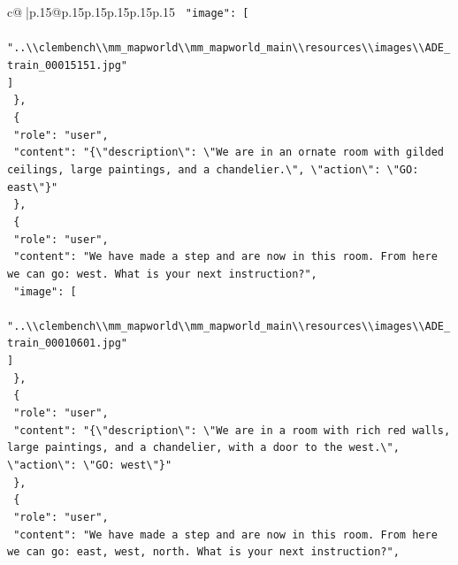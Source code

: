 \documentclass{article}
\begin{document}
{\begin{supertabular}{c@{$\;$}|p{.15\linewidth}@{}p{.15\linewidth}p{.15\linewidth}p{.15\linewidth}p{.15\linewidth}p{.15\linewidth}}
{{{\texttt{    "image": {[}} \\
\texttt{      "..\textbackslash{}\textbackslash{}clembench\textbackslash{}\textbackslash{}mm\_mapworld\textbackslash{}\textbackslash{}mm\_mapworld\_main\textbackslash{}\textbackslash{}resources\textbackslash{}\textbackslash{}images\textbackslash{}\textbackslash{}ADE\_train\_00015151.jpg"} \\
\texttt{    {]}} \\
\texttt{  \},} \\
\texttt{  \{} \\
\texttt{    "role": "user",} \\
\texttt{    "content": "\{\textbackslash{}"description\textbackslash{}": \textbackslash{}"We are in an ornate room with gilded ceilings, large paintings, and a chandelier.\textbackslash{}", \textbackslash{}"action\textbackslash{}": \textbackslash{}"GO: east\textbackslash{}"\}"} \\
\texttt{  \},} \\
\texttt{  \{} \\
\texttt{    "role": "user",} \\
\texttt{    "content": "We have made a step and are now in this room. From here we can go: west. What is your next instruction?",} \\
\texttt{    "image": {[}} \\
\texttt{      "..\textbackslash{}\textbackslash{}clembench\textbackslash{}\textbackslash{}mm\_mapworld\textbackslash{}\textbackslash{}mm\_mapworld\_main\textbackslash{}\textbackslash{}resources\textbackslash{}\textbackslash{}images\textbackslash{}\textbackslash{}ADE\_train\_00010601.jpg"} \\
\texttt{    {]}} \\
\texttt{  \},} \\
\texttt{  \{} \\
\texttt{    "role": "user",} \\
\texttt{    "content": "\{\textbackslash{}"description\textbackslash{}": \textbackslash{}"We are in a room with rich red walls, large paintings, and a chandelier, with a door to the west.\textbackslash{}", \textbackslash{}"action\textbackslash{}": \textbackslash{}"GO: west\textbackslash{}"\}"} \\
\texttt{  \},} \\
\texttt{  \{} \\
\texttt{    "role": "user",} \\
\texttt{    "content": "We have made a step and are now in this room. From here we can go: east, west, north. What is your next instruction?",} \\
}}}
\end{supertabular}}
\end{document}
